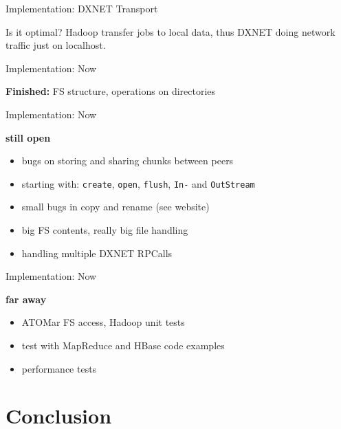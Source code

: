 \begin{frame}{Implementation: DXNET Transport}
\protect\hypertarget{implementation-dxnet-transport}{}

Is it optimal? Hadoop transfer jobs to local data, thus DXNET doing
network traffic just on localhost.

\end{frame}

\begin{frame}{Implementation: Now}
\protect\hypertarget{implementation-now}{}

\textbf{Finished:} FS structure, operations on directories

\end{frame}

\begin{frame}[fragile]{Implementation: Now}
\protect\hypertarget{implementation-now-1}{}

\textbf{still open}

\begin{itemize}
\tightlist
\item
  bugs on storing and sharing chunks between peers
\item
  starting with: \texttt{create}, \texttt{open}, \texttt{flush},
  \texttt{In-} and \texttt{OutStream}
\item
  small bugs in copy and rename (see website)
\item
  big FS contents, really big file handling
\item
  handling multiple DXNET RPCalls
\end{itemize}

\end{frame}

\begin{frame}{Implementation: Now}
\protect\hypertarget{implementation-now-2}{}

\textbf{far away}

\begin{itemize}
\tightlist
\item
  ATOMar FS access, Hadoop unit tests
\item
  test with MapReduce and HBase code examples
\item
  performance tests
\end{itemize}

\end{frame}

\hypertarget{conclusion}{%
\section{Conclusion}\label{conclusion}}

